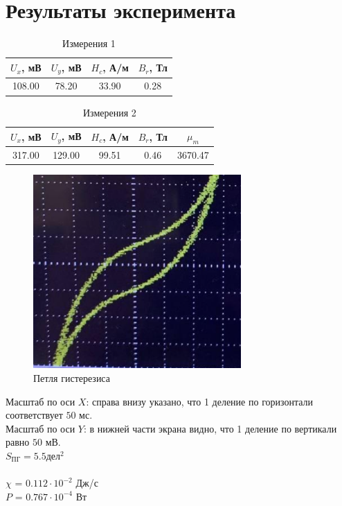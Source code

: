 \documentclass{article}%
\begin{document}
%
\section{Результаты эксперимента}%
\label{sec:}%


\begin{table}[h!]%
\centering%
\begin{tabular}{|c|c|c|c|}%
\hline%
$U_x$, мВ&$U_y$, мВ&$H_c$, А/м&$B_r$, Тл\\%
\hline%
108.00&78.20&33.90&0.28\\%
\hline%
\end{tabular}%
\caption{Измерения 1}%
\end{table}

%


\begin{table}[h!]%
\centering%
\begin{tabular}{|c|c|c|c|c|}%
\hline%
$U_x$, мВ&$U_y$, мВ&$H_c$, А/м&$B_r$, Тл&$\mu_m$\\%
\hline%
317.00&129.00&99.51&0.46&3670.47\\%
\hline%
\end{tabular}%
\caption{Измерения 2}%
\end{table}

%


\begin{figure}[h!]%
\centering%
\includegraphics[width=300px]{other_gyst.png}%
\caption{Петля гистерезиса}%
\end{figure}

%
 Масштаб по оси $X$: справа внизу указано, что 1 деление по горизонтали соответствует $50$ мс.\\ Масштаб по оси $Y$: в нижней части экрана видно, что 1 деление по вертикали равно $50$ мВ.\\$S_{\text{ПГ}} = 5.5 \text{дел}^2$\\%
\\ $\chi$ = $0.112 \cdot 10^{-2}$  Дж/с%
\\ $P$ = $0.767 \cdot 10^{-4}$ Вт%
\end{document}
